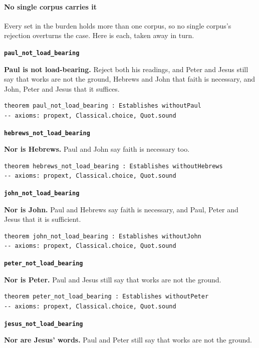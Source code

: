 \documentclass[11pt]{article}
\begin{document}
\paragraph*{No single corpus carries it}
\leavevmode\par
Every set in the burden holds more than one corpus, so no single corpus's rejection overturns the case. Here is each, taken away in turn.

\par\medskip\noindent\textbf{\texttt{paul\_\allowbreak{}not\_\allowbreak{}load\_\allowbreak{}bearing}}\par\nobreak\noindent
\textbf{Paul is not load-bearing.} Reject both his readings, and Peter and Jesus still say that works are not the ground, Hebrews and John that faith is necessary, and John, Peter and Jesus that it suffices.

{\small\begin{verbatim}
theorem paul_not_load_bearing : Establishes withoutPaul
-- axioms: propext, Classical.choice, Quot.sound
\end{verbatim}}
\par\medskip\noindent\textbf{\texttt{hebrews\_\allowbreak{}not\_\allowbreak{}load\_\allowbreak{}bearing}}\par\nobreak\noindent
\textbf{Nor is Hebrews.} Paul and John say faith is necessary too.

{\small\begin{verbatim}
theorem hebrews_not_load_bearing : Establishes withoutHebrews
-- axioms: propext, Classical.choice, Quot.sound
\end{verbatim}}
\par\medskip\noindent\textbf{\texttt{john\_\allowbreak{}not\_\allowbreak{}load\_\allowbreak{}bearing}}\par\nobreak\noindent
\textbf{Nor is John.} Paul and Hebrews say faith is necessary, and Paul, Peter and Jesus that it is sufficient.

{\small\begin{verbatim}
theorem john_not_load_bearing : Establishes withoutJohn
-- axioms: propext, Classical.choice, Quot.sound
\end{verbatim}}
\par\medskip\noindent\textbf{\texttt{peter\_\allowbreak{}not\_\allowbreak{}load\_\allowbreak{}bearing}}\par\nobreak\noindent
\textbf{Nor is Peter.} Paul and Jesus still say that works are not the ground.

{\small\begin{verbatim}
theorem peter_not_load_bearing : Establishes withoutPeter
-- axioms: propext, Classical.choice, Quot.sound
\end{verbatim}}
\par\medskip\noindent\textbf{\texttt{jesus\_\allowbreak{}not\_\allowbreak{}load\_\allowbreak{}bearing}}\par\nobreak\noindent
\textbf{Nor are Jesus' words.} Paul and Peter still say that works are not the ground.
\end{document}
